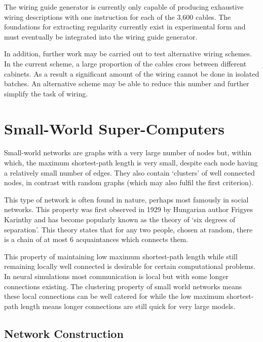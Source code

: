 			The wiring guide generator is currently only capable of producing
			exhaustive wiring descriptions with one instruction for each of the 3,600
			cables. The foundations for extracting regularity currently exist in
			experimental form and must eventually be integrated into the wiring guide
			generator.
			
			In addition, further work may be carried out to test alternative wiring
			schemes. In the current scheme, a large proportion of the cables cross
			between different cabinets. As a result a significant amount of the wiring
			cannot be done in isolated batches. An alternative scheme may be able to
			reduce this number and further simplify the task of wiring.
	
	\section{Small-World Super-Computers}
		
		\label{sec:small-world-super-computers}
		
		Small-world networks are graphs with a very large number of nodes but,
		within which, the maximum shortest-path length is very small, despite each
		node having a relatively small number of edges. They also contain `clusters'
		of well connected nodes, in contrast with random graphs (which may also
		fulfil the first criterion).
		
		This type of network is often found in nature, perhaps most famously in
		social networks. This property was first observed in 1929 by Hungarian
		author Frigyes Karinthy\cite{karinthy29} and has become popularly known as
		the theory of `six degrees of separation'. This theory states that for any
		two people, chosen at random, there is a chain of at most 6 acquaintances
		which connects them.
		
		This property of maintaining low maximum shortest-path length while still
		remaining locally well connected is desirable for certain computational
		problems. In neural simulations most communication is local but with some
		longer connections existing. The clustering property of small world networks
		means these local connections can be well catered for while the low maximum
		shortest-path length means longer connections are still quick for very large
		models.
		
		\subsection{Network Construction}
		
